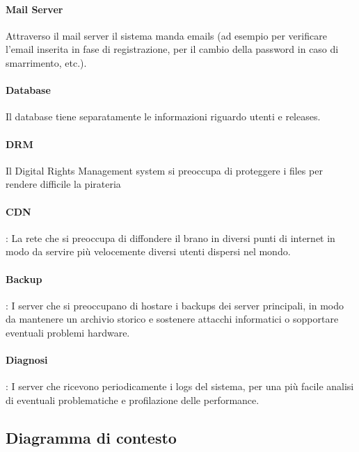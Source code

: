 \documentclass[a4paper,12pt]{article}
\begin{document}
\paragraph{Mail Server} Attraverso il mail server il sistema manda emails (ad esempio per verificare l’email inserita in fase di registrazione, per il cambio della password in caso di smarrimento, etc.).

\paragraph{Database} Il database tiene separatamente le informazioni riguardo utenti e releases.

\paragraph{DRM} Il Digital Rights Management system si preoccupa di proteggere i files per rendere difficile la pirateria

\paragraph{CDN}: La rete che si preoccupa di diffondere il brano in diversi punti di internet in modo da servire più velocemente diversi utenti dispersi nel mondo.

\paragraph{Backup}: I server che si preoccupano di hostare i backups dei server principali, in modo da mantenere un archivio storico e sostenere attacchi informatici o sopportare eventuali problemi hardware.

\paragraph{Diagnosi}: I server che ricevono periodicamente i logs del sistema, per una più facile analisi di eventuali problematiche e profilazione delle performance.

\newpage
\subsection{Diagramma di contesto}
\end{document}
